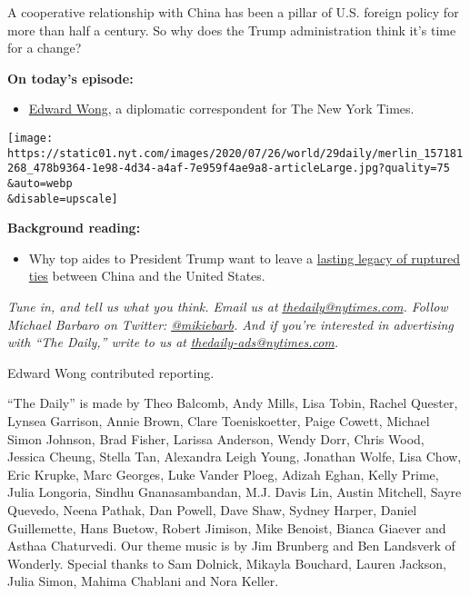 A cooperative relationship with China has been a pillar of U.S. foreign
policy for more than half a century. So why does the Trump
administration think it's time for a change?

\textbf{On today's episode:}

\begin{itemize}
\tightlist
\item
  \href{https://www.nytimes.com/by/edward-wong}{Edward Wong}, a
  diplomatic correspondent for The New York Times.
\end{itemize}

\texttt{[image: https://static01.nyt.com/images/2020/07/26/world/29daily/merlin\_157181268\_478b9364-1e98-4d34-a4af-7e959f4ae9a8-articleLarge.jpg?quality=75\\\&auto=webp\\\&disable=upscale]}

\textbf{Background reading:}

\begin{itemize}
\tightlist
\item
  Why top aides to President Trump want to leave a
  \href{https://www.nytimes.com/2020/07/25/world/asia/us-china-trump-xi.html}{lasting
  legacy of ruptured ties} between China and the United States.
\end{itemize}

\emph{Tune in, and tell us what you think. Email us at}
\href{mailto:thedaily@nytimes.com}{\emph{thedaily@nytimes.com}}\emph{.
Follow Michael Barbaro on Twitter:}
\href{https://twitter.com/mikiebarb}{\emph{@mikiebarb}}\emph{. And if
you're interested in advertising with ``The Daily,'' write to us at}
\href{mailto:thedaily-ads@nytimes.com}{\emph{thedaily-ads@nytimes.com}}\emph{.}

Edward Wong contributed reporting.

``The Daily'' is made by Theo Balcomb, Andy Mills, Lisa Tobin, Rachel
Quester, Lynsea Garrison, Annie Brown, Clare Toeniskoetter, Paige
Cowett, Michael Simon Johnson, Brad Fisher, Larissa Anderson, Wendy
Dorr, Chris Wood, Jessica Cheung, Stella Tan, Alexandra Leigh Young,
Jonathan Wolfe, Lisa Chow, Eric Krupke, Marc Georges, Luke Vander Ploeg,
Adizah Eghan, Kelly Prime, Julia Longoria, Sindhu Gnanasambandan, M.J.
Davis Lin, Austin Mitchell, Sayre Quevedo, Neena Pathak, Dan Powell,
Dave Shaw, Sydney Harper, Daniel Guillemette, Hans Buetow, Robert
Jimison, Mike Benoist, Bianca Giaever and Asthaa Chaturvedi. Our theme
music is by Jim Brunberg and Ben Landsverk of Wonderly. Special thanks
to Sam Dolnick, Mikayla Bouchard, Lauren Jackson, Julia Simon, Mahima
Chablani and Nora Keller.

